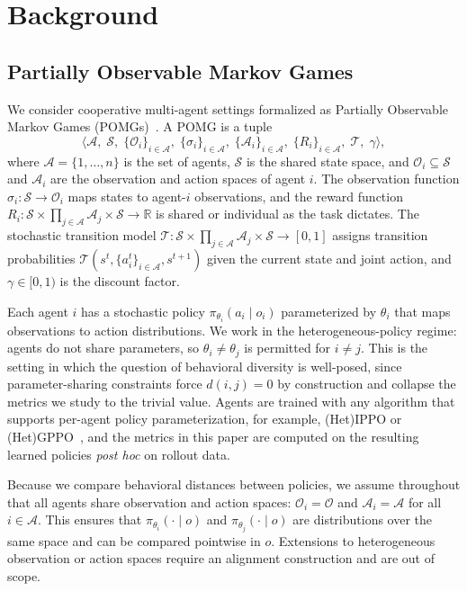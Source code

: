 \documentclass[11pt]{article}
\theoremstyle{plain}
\theoremstyle{definition}
\theoremstyle{remark}
\newcommand{\R}{\mathbb{R}}
\newcommand{\Agents}{\mathcal{A}}        %
\newcommand{\Obs}{\mathcal{O}}           %
\newcommand{\policy}[1]{\pi_{\theta_{#1}}}
\begin{document}
\section{Background}
\label{sec:background}

\subsection{Partially Observable Markov Games}
\label{sec:background:pomg}

We consider cooperative multi-agent settings formalized as Partially
Observable Markov Games (POMGs)~\citep{kaelbling1998planning}. A POMG
is a tuple
\[
\bigl\langle \Agents,\; \mathcal{S},\; \{\Obs_i\}_{i \in \Agents},\;
\{\sigma_i\}_{i \in \Agents},\; \{\mathcal{A}_i\}_{i \in \Agents},\;
\{R_i\}_{i \in \Agents},\; \mathcal{T},\; \gamma \bigr\rangle,
\]
where $\Agents = \{1, \dots, n\}$ is the set of agents, $\mathcal{S}$
is the shared state space, and $\Obs_i \subseteq \mathcal{S}$ and
$\mathcal{A}_i$ are the observation and action spaces of agent $i$.
The observation function $\sigma_i : \mathcal{S} \to \Obs_i$ maps
states to agent-$i$ observations, and the reward function
$R_i : \mathcal{S} \times \prod_{j \in \Agents} \mathcal{A}_j \times
\mathcal{S} \to \R$ is shared or individual as the task dictates. The
stochastic transition model $\mathcal{T} : \mathcal{S} \times
\prod_{j \in \Agents} \mathcal{A}_j \times \mathcal{S} \to [0, 1]$
assigns transition probabilities $\mathcal{T}(s^t, \{a_i^t\}_{i \in
\Agents}, s^{t+1})$ given the current state and joint action, and
$\gamma \in [0, 1)$ is the discount factor.

Each agent $i$ has a stochastic policy $\policy{i}(a_i \mid o_i)$
parameterized by $\theta_i$ that maps observations to action
distributions. We work in the heterogeneous-policy regime: agents do
not share parameters, so $\theta_i \neq \theta_j$ is permitted for
$i \neq j$. This is the setting in which the question of behavioral
diversity is well-posed, since parameter-sharing constraints force
$d(i, j) = 0$ by construction and collapse the metrics we study to
the trivial value. Agents are trained with any algorithm that supports
per-agent policy parameterization, for example,
(Het)IPPO or (Het)GPPO~\citep{bettini2023hetgppo}, and the metrics
in this paper are computed on the resulting learned policies
\emph{post hoc} on rollout data.

Because we compare behavioral distances between policies, we assume
throughout that all agents share observation and action spaces:
$\Obs_i = \Obs$ and $\mathcal{A}_i = \mathcal{A}$ for all
$i \in \Agents$. This ensures that $\policy{i}(\cdot \mid o)$ and
$\policy{j}(\cdot \mid o)$ are distributions over the same space and
can be compared pointwise in $o$. Extensions to heterogeneous
observation or action spaces require an alignment construction and
are out of scope.
\end{document}
